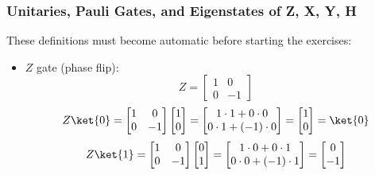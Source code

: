 \subsubsection{Unitaries, Pauli Gates, and Eigenstates of Z, X, Y, H}\label{ex:unitaries-pauli-gates-and-eigenstates-of-z-x-y-h}

These definitions must become automatic before starting the exercises:
\begin{itemize}
    \item $Z$ gate (phase flip):
    \begin{equation*}
        Z = \begin{bmatrix}
            1 & 0 \\
            0 & -1
        \end{bmatrix}
    \end{equation*}
    \begin{equation*}
        Z \ket{0} = \begin{bmatrix}
            1 & 0 \\
            0 & -1
        \end{bmatrix} \begin{bmatrix}
            1 \\ 0
        \end{bmatrix} =
        \begin{bmatrix}
            1 \cdot 1 + 0 \cdot 0 \\
            0 \cdot 1 + (-1) \cdot 0
        \end{bmatrix} =
        \begin{bmatrix}
            1 \\ 0
        \end{bmatrix} =
        \ket{0}
    \end{equation*}
    \begin{equation*}
        Z \ket{1} = \begin{bmatrix}
            1 & 0 \\
            0 & -1
        \end{bmatrix} \begin{bmatrix}
            0 \\ 1
        \end{bmatrix} =
        \begin{bmatrix}
            1 \cdot 0 + 0 \cdot 1 \\
            0 \cdot 0 + (-1) \cdot 1
        \end{bmatrix} =
        \begin{bmatrix}
            0 \\ -1

\end{bmatrix}
\end{equation*}
\end{itemize}
